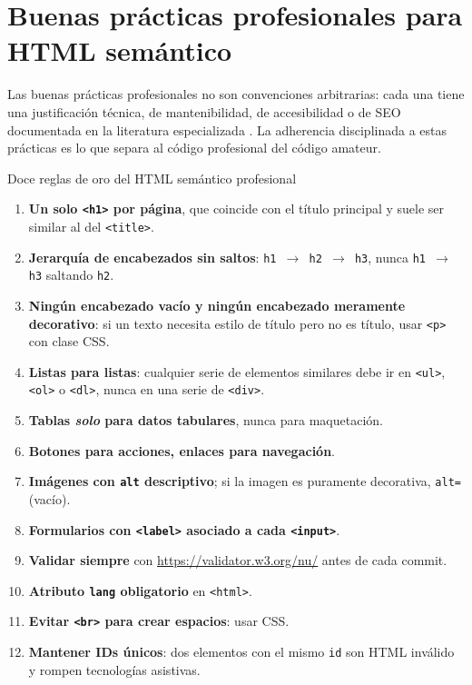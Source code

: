 \documentclass[11pt,a4paper,openany]{book}
\begin{document}
\section{Buenas prácticas profesionales para HTML semántico}

Las buenas prácticas profesionales no son convenciones arbitrarias:
cada una tiene una justificación técnica, de mantenibilidad, de
accesibilidad o de SEO documentada en la literatura especializada
\cite{robbins2018learning,duckett2011html}. La adherencia disciplinada
a estas prácticas es lo que separa al código profesional del código
amateur.

\begin{cajabuenas}{Doce reglas de oro del HTML semántico profesional}
\begin{enumerate}
\item \textbf{Un solo \texttt{<h1>} por página}, que coincide con el
título principal y suele ser similar al del \texttt{<title>}.
\item \textbf{Jerarquía de encabezados sin saltos}:
\texttt{h1 $\rightarrow$ h2 $\rightarrow$ h3}, nunca
\texttt{h1 $\rightarrow$ h3} saltando \texttt{h2}.
\item \textbf{Ningún encabezado vacío y ningún encabezado meramente
decorativo}: si un texto necesita estilo de título pero no es título,
usar \texttt{<p>} con clase CSS.
\item \textbf{Listas para listas}: cualquier serie de elementos
similares debe ir en \texttt{<ul>}, \texttt{<ol>} o \texttt{<dl>},
nunca en una serie de \texttt{<div>}.
\item \textbf{Tablas \emph{solo} para datos tabulares}, nunca para
maquetación.
\item \textbf{Botones para acciones, enlaces para navegación}.
\item \textbf{Imágenes con \texttt{alt} descriptivo}; si la imagen
es puramente decorativa, \texttt{alt=  } (vacío).
\item \textbf{Formularios con \texttt{<label>} asociado a cada
\texttt{<input>}}.
\item \textbf{Validar siempre} con \url{https://validator.w3.org/nu/}
antes de cada commit.
\item \textbf{Atributo \texttt{lang} obligatorio} en \texttt{<html>}.
\item \textbf{Evitar \texttt{<br>} para crear espacios}: usar CSS.
\item \textbf{Mantener IDs únicos}: dos elementos con el mismo
\texttt{id} son HTML inválido y rompen tecnologías asistivas.
\end{enumerate}
\end{cajabuenas}
\end{document}
